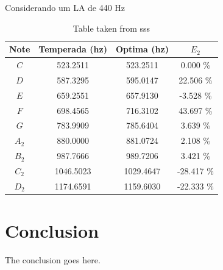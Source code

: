 \documentclass{article}
\begin{document}
Considerando um LA de 440 Hz
\begin{table}[h]
\center
\begin{tabular}{|c||c|c|c|}
\hline                           
Note & Temperada (hz) & Optima (hz) & $E_2$\\ \hline
\hline                           
    $C$ & 523.2511 & 523.2511 &   0.000 \% \\ \hline 
    $D$ & 587.3295 & 595.0147 &  22.506 \% \\ \hline 
    $E$ & 659.2551 & 657.9130 &  -3.528 \% \\ \hline 
    $F$ & 698.4565 & 716.3102 &  43.697 \% \\ \hline 
    $G$ & 783.9909 & 785.6404 &   3.639 \% \\ \hline 
  $A_2$ & 880.0000 & 881.0724 &   2.108 \% \\ \hline 
  $B_2$ & 987.7666 & 989.7206 &   3.421 \% \\ \hline 
  $C_2$ & 1046.5023 & 1029.4647 & -28.417 \% \\ \hline 
  $D_2$ & 1174.6591 & 1159.6030 & -22.333 \% \\ \hline 
\end{tabular}
\vspace{5pt}
\caption{Table taken from sss}
\label{table:example1}
\end{table}


\section{Conclusion}
The conclusion goes here.




\printbibliography


\end{document}
